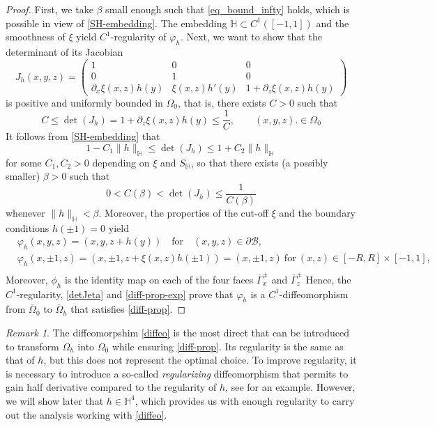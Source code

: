 \documentclass[11pt,a4paper]{amsart}
\theoremstyle{remark}
\newtheorem{remark}[proposition]{Remark}
\theoremstyle{definition}
\numberwithin{equation}{section}
\numberwithin{proposition}{section}
\begin{document}
\begin{proof}First, we take $\beta$  small enough such that \eqref{eq_bound_infty} holds, which is possible in view of \eqref{SH-embedding}. The embedding $\mathbb{H}\subset C^1([-1,1])$ and the smoothness of $\xi$ yield $C^1$-regularity of $\varphi_h$. Next, we want to show that the determinant of its Jacobian
$$J_h(x,y,z)= \left(\begin{matrix}
1&0&0\\[5pt]
0&1&0\\[5pt]
\partial_x\xi(x,z)h(y)&\xi(x,z)h'(y)&1+ \partial_z\xi(x,z)h(y)
\end{matrix}\right)$$
is positive and uniformly bounded in $\Omega_0$, that is, there exists $C>0$ such that
\begin{equation}\label{detJeta} C \leq \det(J_h)=1 + \partial_z\xi(x,z) h(y) \leq \frac{1}{C}, \qquad (x,y,z).\in \Omega_0\end{equation}
It follows from \eqref{SH-embedding} that
\begin{equation}\label{est-detJeta}
 1- C_1\|h\|_{\mathbb{H}}\leq \det(J_h)\leq  1 +C_2 \|h\|_{\mathbb{H}}
\end{equation}for some $C_1,C_2>0$ depending on $\xi$ and $S_\mathbb{H}$, so that
there exists (a possibly smaller) $\beta>0$ such that $$0<C(\beta)< \det(J_h)\leq \frac{1}{C(\beta)}$$ whenever $\|h\|_{\mathbb{H}}<\beta$. Moreover, the properties of the cut-off $\xi$ and the boundary conditions $h(\pm1)=0$ yield
\begin{equation}\label{diff-prop-exp} \begin{aligned}
 &\varphi_h(x,y,z)= (x,y, z+h(y)) \quad \text{for} \quad (x,y,z)\in\mathcal{\partial B},\\[5pt]
 &\varphi_h(x, \pm 1, z)= (x,\pm 1, z +\xi(x,z)h(\pm 1))=(x, \pm 1, z) \ \text{for} \ (x,z)\in[-R,R]\times [-1,1],
 \\[5pt]
\end{aligned}\end{equation}Moreover, $\phi_h$ is the identity map on each of the four faces $\overline{\Gamma}_x^\pm$ and $\overline{\Gamma}_z^\pm$
Hence, the $C^1$-regularity,  \eqref{detJeta} and \eqref{diff-prop-exp} prove that $\varphi_h$ is a $C^1$-diffeomorphism from $\overline{\Omega}_0$ to $\overline{\Omega}_h$ that satisfies \eqref{diff-prop}.
\end{proof}

\begin{remark}
The diffeomorpshim \eqref{diffeo} is the most direct that can be introduced to transform $\Omega_h$ into $\Omega_0$ while ensuring \eqref{diff-prop}. Its regularity is the same as that of $h$, but this does not represent the optimal choice. To improve regularity, it is necessary to introduce a so-called \emph{regularizing} diffeomorphism that permits to gain half derivative compared to the regularity of $h$, see \cite{BocCasGan} for an example. However, we will show later that $h\in\mathbb{H}^4$, which provides us with enough regularity to carry out the analysis working with \eqref{diffeo}.
\end{remark}
\end{document}
